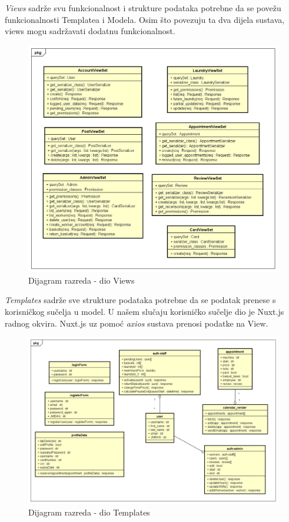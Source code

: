 			\pagebreak
			\emph{Views} sadrže svu funkcionalnost i strukture podataka potrebne da se povežu funkcionalnosti Templatea i Modela. Osim što povezuju ta dva dijela sustava, views mogu sadržavati dodatnu funkcionalnost.
			\begin{figure}[H]
				\includegraphics[scale=0.55]{slike/Razredni_dijagrami_Views.PNG}
				\centering
				\caption{Dijagram razreda - dio Views}
				\label{fig:promjene}
			\end{figure}  	
		
		 	\pagebreak			
 			\emph{Templates} sadrže sve strukture podataka potrebne da se podatak prenese s korisničkog sučelja u model. U našem slučaju korisničko sučelje dio je Nuxt.js radnog okvira. Nuxt.js uz pomoć \emph{axios} sustava prenosi podatke na View.
 			\begin{figure}[H]
 				\includegraphics[scale=0.45]{slike/Razredni_dijagrami_Templates.PNG}
 				\centering
 				\caption{Dijagram razreda - dio Templates}
 				\label{fig:promjene}
 			\end{figure} 	
 		

